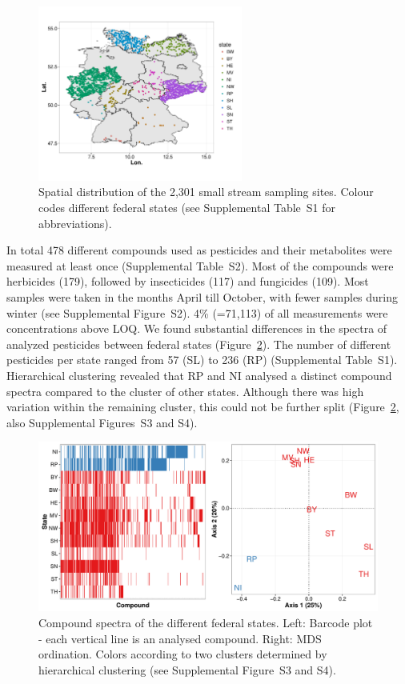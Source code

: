 \documentclass[journal=esthag,manuscript=article]{achemso}
\begin{document}
\begin{figure}[ht]
  \includegraphics[width=0.6\textwidth]{figure1.pdf}
  \caption{Spatial distribution of the 2,301 small stream sampling sites. Colour codes different federal states (see Supplemental Table~S1 for abbreviations).}
  \label{fig:fig1}
\end{figure}

In total 478 different compounds used as pesticides and their metabolites were measured at least once (Supplemental Table~S2). 
Most of the compounds were herbicides (179), followed by insecticides (117) and fungicides (109). %
Most samples were taken in the months April till October, with fewer samples during winter (see Supplemental Figure~S2).
4\% (=71,113) of all measurements were concentrations above LOQ.
We found substantial differences in the spectra of analyzed pesticides between federal states (Figure~\ref{fig:fig2}).
The number of different pesticides per state ranged from 57 (SL) to 236 (RP) (Supplemental Table~S1).
Hierarchical clustering revealed that RP and NI analysed a distinct compound spectra compared to the cluster of other states.
Although there was high variation within the remaining cluster, this could not be further split (Figure~\ref{fig:fig2}, also Supplemental Figures~S3 and S4).

\begin{figure}[ht]
  \includegraphics[width=\textwidth]{figure2.pdf}
  \caption{Compound spectra of the different federal states. Left: Barcode plot - each vertical line is an analysed compound. Right: MDS ordination. 
  Colors according to two clusters determined by hierarchical clustering (see Supplemental Figure~S3 and S4).}
  \label{fig:fig2}
\end{figure}
\end{document}
